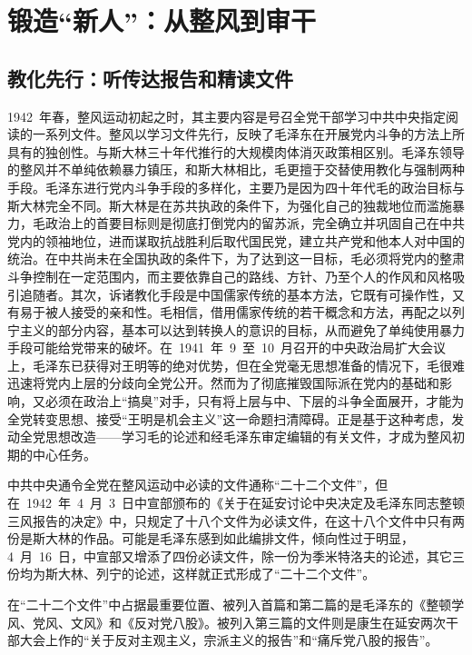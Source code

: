 
\chapter{锻造“新人”：从整风到审干}

\section{教化先行：听传达报告和精读文件}

1942~年春，整风运动初起之时，其主要内容是号召全党干部学习中共中央指定阅读的一系列文件。整风以学习文件先行，反映了毛泽东在开展党内斗争的方法上所具有的独创性。与斯大林三十年代推行的大规模肉体消灭政策相区别。毛泽东领导的整风并不单纯依赖暴力镇压，和斯大林相比，毛更擅于交替使用教化与强制两种手段。毛泽东进行党内斗争手段的多样化，主要乃是因为四十年代毛的政治目标与斯大林完全不同。斯大林是在苏共执政的条件下，为强化自己的独裁地位而滥施暴力，毛政治上的首要目标则是彻底打倒党内的留苏派，完全确立并巩固自己在中共党内的领袖地位，进而谋取抗战胜利后取代国民党，建立共产党和他本人对中国的统治。在中共尚未在全国执政的条件下，为了达到这一目标，毛必须将党内的整肃斗争控制在一定范围内，而主要依靠自己的路线、方针、乃至个人的作风和风格吸引追随者。其次，诉诸教化手段是中国儒家传统的基本方法，它既有可操作性，又有易于被人接受的亲和性。毛相信，借用儒家传统的若干概念和方法，再配之以列宁主义的部分内容，基本可以达到转换人的意识的目标，从而避免了单纯使用暴力手段可能给党带来的破坏。在~1941~年~9~至~10~月召开的中央政治局扩大会议上，毛泽东已获得对王明等的绝对优势，但在全党毫无思想准备的情况下，毛很难迅速将党内上层的分歧向全党公开。然而为了彻底摧毁国际派在党内的基础和影响，又必须在政治上“搞臭”对手，只有将上层与中、下层的斗争全面展开，才能为全党转变思想、接受“王明是机会主义”这一命题扫清障碍。正是基于这种考虑，发动全党思想改造——学习毛的论述和经毛泽东审定编辑的有关文件，才成为整风初期的中心任务。

中共中央通令全党在整风运动中必读的文件通称“二十二个文件”，但在~1942~年~4~月~3~日中宣部颁布的《关于在延安讨论中央决定及毛泽东同志整顿三风报告的决定》中，只规定了十八个文件为必读文件，在这十八个文件中只有两份是斯大林的作品。可能是毛泽东感到如此编排文件，倾向性过于明显，4~月~16~日，中宣部又增添了四份必读文件，除一份为季米特洛夫的论述，其它三份均为斯大林、列宁的论述，这样就正式形成了“二十二个文件”。

在“二十二个文件”中占据最重要位置、被列入首篇和第二篇的是毛泽东的《整顿学风、党风、文风》和《反对党八股》。被列入第三篇的文件则是康生在延安两次干部大会上作的“关于反对主观主义，宗派主义的报告”和“痛斥党八股的报告”。

